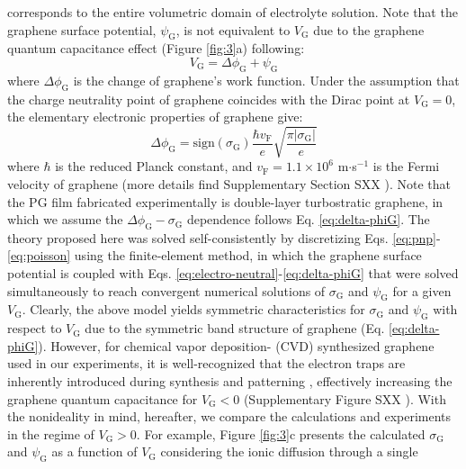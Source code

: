 \documentclass[manuscript=letter, email=true, hyperref=true, keywords=false]{achemso}
\begin{document}
corresponds to the entire volumetric domain of electrolyte
solution. Note that the graphene surface potential,
$\psi_{\mathrm{G}}$, is not equivalent to $V_{\mathrm{G}}$ due to the
graphene quantum capacitance effect  (Figure
\ref{fig:3}a) following:
\begin{equation}
  \label{eq:Vg}
  V_{\mathrm{G}} = \Delta \phi_{\mathrm{G}} + \psi_{\mathrm{G}}
\end{equation}
where $\Delta \phi_{\mathrm{G}}$ is the change of graphene’s work
function. Under the assumption that the charge neutrality point of
graphene coincides with the Dirac point at $V_{\mathrm{G}}=0$, the elementary
electronic properties of graphene give:
\begin{equation}
  \label{eq:delta-phiG}
  \Delta \phi_{\mathrm{G}} = \mathrm{sign}(\sigma_{\mathrm{G}}) \frac{\hbar v_{\mathrm{F}}}{e}
  \sqrt{\frac{\pi |\sigma_{\mathrm{G}}|}{e}}
\end{equation}
where $\hbar$ is the reduced Planck constant, and
$v_{\mathrm{F}}=1.1\times10^{6}$ m$\cdot$s$^{-1}$ is the Fermi
velocity of graphene (more details find Supplementary Section SXX
). Note that the PG film fabricated experimentally is
double-layer turbostratic graphene, in which we assume the
$\Delta \phi_{\mathrm{G}} - \sigma_{\mathrm{G}}$ dependence follows
Eq. \ref{eq:delta-phiG}. The theory proposed here was solved
self-consistently by discretizing Eqs. \ref{eq:pnp}-\ref{eq:poisson}
using the finite-element method, in which the graphene surface
potential is coupled with
Eqs. \ref{eq:electro-neutral}-\ref{eq:delta-phiG} that were solved
simultaneously to reach convergent numerical solutions of
$\sigma_{\mathrm{G}}$ and $\psi_{\mathrm{G}}$ for a given
$V_{\mathrm{G}}$. Clearly, the above model yields symmetric
characteristics for $\sigma_{\mathrm{G}}$ and $\psi_{\mathrm{G}}$ with
respect to $V_{\mathrm{G}}$ due to the symmetric band structure of
graphene (Eq. \ref{eq:delta-phiG}). However, for chemical vapor
deposition- (CVD) synthesized graphene used in our experiments, it is
well-recognized that the electron traps are inherently introduced
during synthesis and patterning , effectively increasing the
graphene quantum capacitance for $V_{\mathrm{G}}<0$ (Supplementary
Figure SXX ). With the nonideality in mind, hereafter, we
compare the calculations and experiments in the regime of
$V_{\mathrm{G}}>0$. For example, Figure \ref{fig:3}c presents the
calculated $\sigma_{\mathrm{G}}$ and $\psi_{\mathrm{G}}$ as a function
of $V_{\mathrm{G}}$ considering the ionic diffusion through a single
\end{document}
